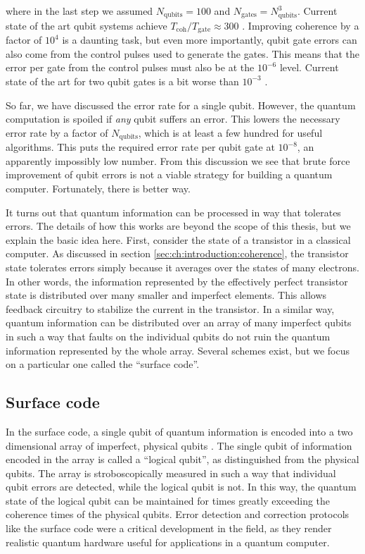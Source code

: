 where in the last step we assumed $N_{\text{qubits}}=100$ and $N_{\text{gates}}=N_{\text{qubits}}^3$.
Current state of the art qubit systems achieve $T_{\text{coh}}/T_{\text{gate}} \approx 300$ \cite{Barends:gates2014}.
Improving coherence by a factor of $10^4$ is a daunting task, but even more importantly, qubit gate errors can also come from the control pulses used to generate the gates.
This means that the error per gate from the control pulses must also be at the $10^{-6}$ level.
Current state of the art for two qubit gates is a bit worse than $10^{-3}$ \cite{Barends:gates2014}.

So far, we have discussed the error rate for a single qubit.
However, the quantum computation is spoiled if \emph{any} qubit suffers an error.
This lowers the necessary error rate by a factor of $N_{\text{qubits}}$, which is at least a few hundred for useful algorithms.
This puts the required error rate per qubit gate at $10^{-8}$, an apparently impossibly low number.
From this discussion we see that brute force improvement of qubit errors is not a viable strategy for building a quantum computer.
Fortunately, there is better way.

It turns out that quantum information can be processed in way that tolerates errors.
The details of how this works are beyond the scope of this thesis, but we explain the basic idea here.
First, consider the state of a transistor in a classical computer.
As discussed in section \ref{sec:ch:introduction:coherence}, the transistor state tolerates errors simply because it averages over the states of many electrons.
In other words, the information represented by the effectively perfect transistor state is distributed over many smaller and imperfect elements.
This allows feedback circuitry to stabilize the current in the transistor.
In a similar way, quantum information can be distributed over an array of many imperfect qubits in such a way that faults on the individual qubits do not ruin the quantum information represented by the whole array.
Several schemes exist, but we focus on a particular one called the ``surface code''.

\subsection{Surface code}

In the surface code, a single qubit of quantum information is encoded into a two dimensional array of imperfect, physical qubits  \cite{Cleland:surfaceCode2012, Roussendorf:surfaceCode2007}.
The single qubit of information encoded in the array is called a ``logical qubit'', as distinguished from the physical qubits.
The array is stroboscopically measured in such a way that individual qubit errors are detected, while the logical qubit is not.
In this way, the quantum state of the logical qubit can be maintained for times greatly exceeding the coherence times of the physical qubits.
Error detection and correction protocols like the surface code were a critical development in the field, as they render realistic quantum hardware useful for applications in a quantum computer.

